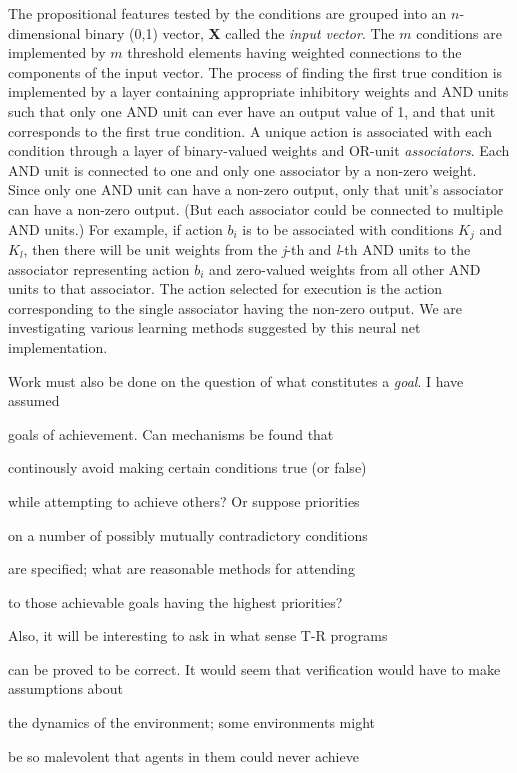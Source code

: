 The propositional features tested by the conditions are grouped into an  
$n$-dimensional  binary (0,1) vector, {\bf {\sf X}} called the {\it input  
vector}.  The $m$ conditions are implemented by $m$ threshold elements having  
weighted connections to the components of the input vector.  The process of  
finding the first true condition is implemented by a layer containing  
appropriate inhibitory weights and AND units such that only one AND unit can  
ever have an output value of 1, and that unit corresponds to the first true  
condition. A unique action is associated with each condition through a layer  
of binary-valued weights and OR-unit {\it associators}.  Each AND unit is  
connected to one and only one associator by a non-zero weight.  Since only  
one AND unit can have a non-zero output, only that unit's associator  can  
have a non-zero output.  (But each associator could be connected to multiple  
AND units.)  For example, if action $b_i$ is to be associated with conditions  
$K_j$ and $K_l$, then there will be unit weights from the {\it j}-th and {\it  
l}-th AND units to the associator representing action $b_i$ and zero-valued  
weights from all other AND units to that associator.  The action selected for  
execution is the action corresponding to the single associator having the  
non-zero output.  We are investigating various learning methods suggested by  
this neural net implementation.

Work must also be done on the question of  what constitutes a {\it goal}.  I  
have assumed 

goals of achievement.  Can mechanisms be found that 

continously avoid making certain conditions true (or false) 

while attempting to achieve others?  Or suppose  priorities 

on a number of possibly mutually contradictory conditions 

are specified; what are reasonable methods for attending 

to those achievable goals having the highest priorities? 


Also, it will be interesting to ask in what sense T-R programs 

can be proved to be correct. It would seem that verification would have to  
make assumptions about 

the dynamics of the environment; some environments might 

be so malevolent that agents in them could never achieve 

